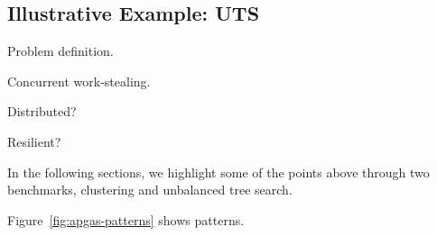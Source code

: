 \subsection{Illustrative Example: UTS}

Problem definition.

Concurrent work-stealing.

Distributed?

Resilient?

In the following sections, we highlight some of the points above through two
benchmarks, \kmeans clustering and unbalanced tree search.

% 

Figure~\ref{fig:apgas-patterns} shows patterns.
